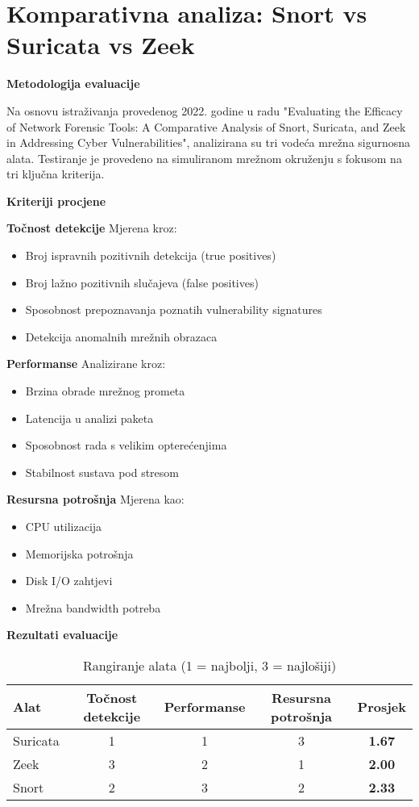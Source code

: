 \chapter{Komparativna analiza: Snort vs Suricata vs Zeek}

\textbf{Metodologija evaluacije}

Na osnovu istraživanja provedenog 2022. godine u radu "Evaluating the Efficacy of Network Forensic Tools: A Comparative Analysis of Snort, Suricata, and Zeek in Addressing Cyber Vulnerabilities", analizirana su tri vodeća mrežna sigurnosna alata. Testiranje je provedeno na simuliranom mrežnom okruženju s fokusom na tri ključna kriterija.

\textbf{Kriteriji procjene}

\textbf{Točnost detekcije}
Mjerena kroz:
\begin{itemize}
\item Broj ispravnih pozitivnih detekcija (true positives)
\item Broj lažno pozitivnih slučajeva (false positives)
\item Sposobnost prepoznavanja poznatih vulnerability signatures
\item Detekcija anomalnih mrežnih obrazaca
\end{itemize}

\textbf{Performanse}
Analizirane kroz:
\begin{itemize}
\item Brzina obrade mrežnog prometa
\item Latencija u analizi paketa
\item Sposobnost rada s velikim opterećenjima
\item Stabilnost sustava pod stresom
\end{itemize}

\textbf{Resursna potrošnja}
Mjerena kao:
\begin{itemize}
\item CPU utilizacija
\item Memorijska potrošnja
\item Disk I/O zahtjevi
\item Mrežna bandwidth potreba
\end{itemize}

\textbf{Rezultati evaluacije}

\begin{table}[h]
\centering
\begin{tabular}{|l|c|c|c|c|}
\hline
\textbf{Alat} & \textbf{Točnost detekcije} & \textbf{Performanse} & \textbf{Resursna potrošnja} & \textbf{Prosjek} \\
\hline
Suricata & 1 & 1 & 3 & \textbf{1.67} \\
\hline
Zeek & 3 & 2 & 1 & \textbf{2.00} \\
\hline
Snort & 2 & 3 & 2 & \textbf{2.33} \\
\hline
\end{tabular}
\caption{Rangiranje alata (1 = najbolji, 3 = najlošiji)}
\end{table}

